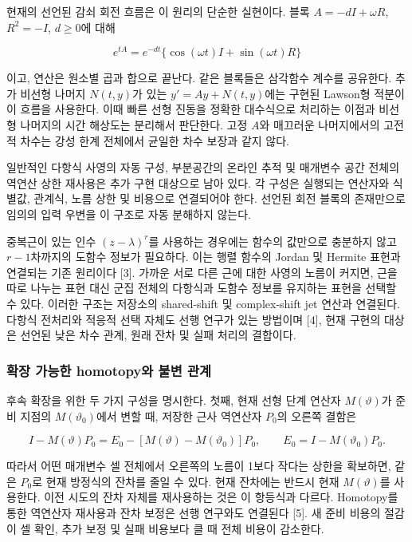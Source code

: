 \documentclass[
  10pt,
  dvipsnames]{article}
\begin{document}
현재의 선언된 감쇠 회전 흐름은 이 원리의 단순한 실현이다. 블록
\(A=-dI+\omega R\), \(R^2=-I\), \(d\ge0\)에 대해

\[
 e^{tA}=e^{-dt}\{\cos(\omega t)I+\sin(\omega t)R\}
 \tag{C13}
\]

이고, 연산은 원소별 곱과 합으로 끝난다. 같은 블록들은 삼각함수 계수를
공유한다. 추가 비선형 나머지 \(N(t,y)\)가 있는 \(y'=Ay+N(t,y)\)에는
구현된 Lawson형 적분이 이 흐름을 사용한다. 이때 빠른 선형 진동을 정확한
대수식으로 처리하는 이점과 비선형 나머지의 시간 해상도는 분리해서
판단한다. 고정 \(A\)와 매끄러운 나머지에서의 고전적 차수는 강성 한계
전체에서 균일한 차수 보장과 같지 않다.

일반적인 다항식 사영의 자동 구성, 부분공간의 온라인 추적 및 매개변수
공간 전체의 역연산 상한 재사용은 추가 구현 대상으로 남아 있다. 각 구성은
실행되는 연산자와 식별값, 관계식, 노름 상한 및 비용으로 연결되어야 한다.
선언된 회전 블록의 존재만으로 임의의 입력 우변을 이 구조로 자동 분해하지
않는다.

중복근이 있는 인수 \((z-\lambda)^r\)를 사용하는 경우에는 함수의 값만으로
충분하지 않고 \(r-1\)차까지의 도함수 정보가 필요하다. 이는 행렬 함수의
Jordan 및 Hermite 표현과 연결되는 기존 원리이다 {[}3{]}. 가까운 서로
다른 근에 대한 사영의 노름이 커지면, 근을 따로 나누는 표현 대신 군집
전체의 다항식과 도함수 정보를 유지하는 표현을 선택할 수 있다. 이러한
구조는 저장소의 shared-shift 및 complex-shift jet 연산과 연결된다.
다항식 전처리와 적응적 선택 자체도 선행 연구가 있는 방법이며 {[}4{]},
현재 구현의 대상은 선언된 낮은 차수 관계, 원래 잔차 및 실패 처리의
결합이다.

\hypertarget{uxd655uxc7a5-uxac00uxb2a5uxd55c-homotopyuxc640-uxbd88uxbcc0-uxad00uxacc4}{%
\subsubsection{확장 가능한 homotopy와 불변
관계}\label{uxd655uxc7a5-uxac00uxb2a5uxd55c-homotopyuxc640-uxbd88uxbcc0-uxad00uxacc4}}

후속 확장을 위한 두 가지 구성을 명시한다. 첫째, 현재 선형 단계 연산자
\(M(\vartheta)\)가 준비 지점의 \(M(\vartheta_0)\)에서 변할 때, 저장한
근사 역연산자 \(P_0\)의 오른쪽 결함은

\[
 I-M(\vartheta)P_0=E_0-[M(\vartheta)-M(\vartheta_0)]P_0,
 \qquad E_0=I-M(\vartheta_0)P_0.
 \tag{C14}
\]

따라서 어떤 매개변수 셀 전체에서 오른쪽의 노름이 1보다 작다는 상한을
확보하면, 같은 \(P_0\)로 현재 방정식의 잔차를 줄일 수 있다. 현재
잔차에는 반드시 현재 \(M(\vartheta)\)를 사용한다. 이전 시도의 잔차
자체를 재사용하는 것은 이 항등식과 다르다. Homotopy를 통한 역연산자
재사용과 잔차 보정은 선행 연구와도 연결된다 {[}5{]}. 새 준비 비용의
절감이 셀 확인, 추가 보정 및 실패 비용보다 클 때 전체 비용이 감소한다.
\end{document}
